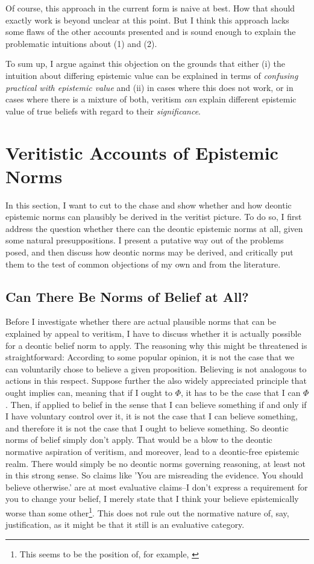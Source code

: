 \documentclass[12pt,numbers=noenddot]{scrartcl}
\begin{document}
Of course, this approach in the current form is naive at best. How that should exactly work is beyond unclear at this point. But I think this approach lacks some flaws of the other accounts presented and is sound enough to explain the problematic intuitions about (1) and (2).

To sum up, I argue against this objection on the grounds that either (i) the intuition about differing epistemic value can be explained in terms of \emph{confusing practical with epistemic value} and (ii) in cases where this does not work, or in cases where there is a mixture of both, veritism \emph{can} explain different epistemic value of true beliefs with regard to their \emph{significance}.

\clearpage
\section{Veritistic Accounts of Epistemic Norms}

In this section, I want to cut to the chase and show whether and how deontic epistemic norms can plausibly be derived in the veritist picture. To do so, I first address the question whether there can the deontic epistemic norms at all, given some natural presuppositions. I present a putative way out of the problems posed, and then discuss how deontic norms may be derived, and critically put them to the test of common objections of my own and from the literature.

\subsection{Can There Be Norms of Belief at All?}

Before I investigate whether there are actual plausible norms that can be explained by appeal to veritism, I have to discuss whether it is actually possible for a deontic belief norm to apply. The reasoning why this might be threatened is straightforward: According to some popular opinion, it is not the case that we can voluntarily chose to believe a given proposition. Believing is not analogous to actions in this respect. Suppose further the also widely appreciated principle that ought implies can, meaning that if I ought to $\Phi$, it has to be the case that I can $\Phi$. Then, if applied to belief in the sense that I can believe something if and only if I have voluntary control over it, it is not the case that I can believe something, and therefore it is not the case that I ought to believe something. So deontic norms of belief simply don't apply. That would be a blow to the deontic normative aspiration of veritism, and moreover, lead to a deontic-free epistemic realm. There would simply be no deontic norms governing reasoning, at least not in this strong sense. So claims like 'You are misreading the evidence. You should  believe otherwise.' are at most evaluative claims–I don't express a requirement for you to change your belief, I merely state that I think your believe epistemically worse than some other\footnote{This seems to be the position of, for example, \textcite[241]{grundmann2008}}. This does not rule out the normative nature of, say, justification, as it might be that it still is an evaluative category. 
\end{document}
